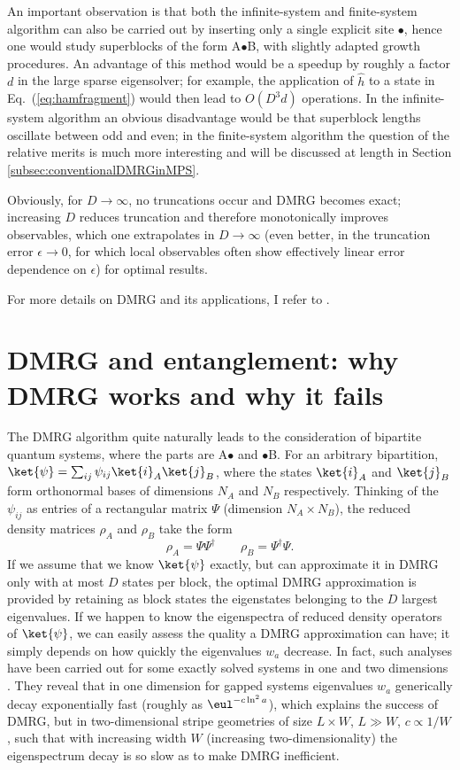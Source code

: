 An important observation is that both the infinite-system and finite-system algorithm can also be carried out by inserting only a single explicit site $\bullet$, hence one would study superblocks of the form A$\bullet$B, with slightly adapted growth procedures. An advantage of this method would be a speedup by roughly a factor $d$ in the large sparse eigensolver; for example, the application of $\hat{h}$ to a state in Eq.~(\ref{eq:hamfragment}) would then lead to $O(D^3 d)$ operations.
In the infinite-system algorithm an obvious disadvantage would be that superblock lengths oscillate between odd and even; in the finite-system algorithm the question of the relative merits is much more interesting and will be discussed at length in Section \ref{subsec:conventionalDMRGinMPS}.

Obviously, for $D\rightarrow\infty$, no truncations occur and DMRG becomes exact; increasing $D$ reduces truncation and therefore monotonically improves observables, which one extrapolates in $D\rightarrow\infty$ (even better, in the truncation error $\epsilon\rightarrow 0$, for which local observables often show effectively linear error dependence on $\epsilon$) for optimal results.

For more details on DMRG and its applications, I refer to \cite{Schollwoeck05}. 
  
\section{DMRG and entanglement: why DMRG works and why it fails}
The DMRG algorithm quite naturally leads to the consideration of bipartite quantum systems, where the parts are A$\bullet$ and $\bullet$B. For an arbitrary bipartition,  $\ket{\psi} = \sum_{ij} \psi_{ij} \ket{i}_A \ket{j}_B$, where the states $\ket{i}_A$ and $\ket{j}_B$ form orthonormal bases of dimensions $N_A$ and $N_B$ respectively. Thinking of the $\psi_{ij}$ as entries of a rectangular matrix $\Psi$ (dimension $N_A \times N_B$), the reduced density matrices $\rho_A$ and $\rho_B$ take the form
\begin{equation}
\rho_A = \Psi \Psi^\dagger \quad\quad \rho_B = \Psi^\dagger \Psi.
\label{eq:ABdensityoperators}
\end{equation}
If we assume that we know $\ket{\psi}$ exactly, but can approximate it in DMRG only with at most $D$ states per block, the optimal DMRG approximation is provided by retaining as block states the eigenstates belonging to the $D$ largest eigenvalues. If we happen to know the eigenspectra of reduced density operators of $\ket{\psi}$, we can easily assess the quality a DMRG approximation can have; it simply depends on how quickly the eigenvalues $w_a$ decrease. In fact, such analyses have been carried out for some exactly solved systems in one and two dimensions \cite{Peschel99,Okunishi99,Chung00,Chung01,Chan02}. They reveal that in one dimension for gapped systems eigenvalues $w_a$  generically decay exponentially fast (roughly as $\eul^{- c \ln^2 a}$), which explains the success of DMRG, but in two-dimensional stripe geometries of size $L \times W$, $L\gg W$, $c \propto 1/W$, such that with increasing width $W$ (increasing two-dimensionality) the eigenspectrum decay is so slow as to make DMRG inefficient. 

